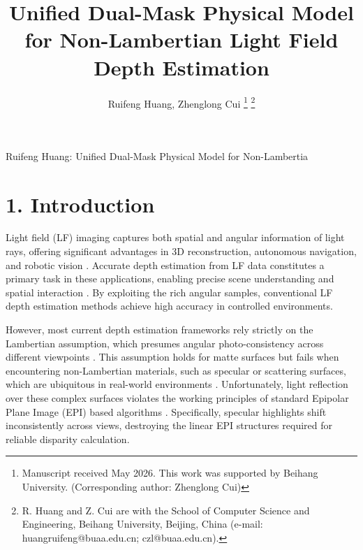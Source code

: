 \documentclass[lettersize,journal]{IEEEtran}
\begin{document}
\title{Unified Dual-Mask Physical Model for Non-Lambertian Light Field Depth Estimation}

\author{Ruifeng Huang, Zhenglong Cui
\thanks{Manuscript received May 2026. This work was supported by Beihang University. (Corresponding author: Zhenglong Cui)}
\thanks{R. Huang and Z. Cui are with the School of Computer Science and Engineering, Beihang University, Beijing, China (e-mail: huangruifeng@buaa.edu.cn; czl@buaa.edu.cn).}}

%
{Ruifeng Huang: Unified Dual-Mask Physical Model for Non-Lambertia}

\maketitle

\begin{abstract}

\end{abstract}

\begin{IEEEkeywords}

\end{IEEEkeywords}

\section{1. Introduction}

Light field (LF) imaging captures both spatial and angular information of light rays, offering significant advantages in 3D reconstruction, autonomous navigation, and robotic vision \cite{lightfieldimaging3Dreconst}. Accurate depth estimation from LF data constitutes a primary task in these applications, enabling precise scene understanding and spatial interaction \cite{depthestimationsceneunderst}. By exploiting the rich angular samples, conventional LF depth estimation methods achieve high accuracy in controlled environments.

However, most current depth estimation frameworks rely strictly on the Lambertian assumption, which presumes angular photo-consistency across different viewpoints \cite{Lambertianassumptionphotoco}. This assumption holds for matte surfaces but fails when encountering non-Lambertian materials, such as specular or scattering surfaces, which are ubiquitous in real-world environments \cite{nonLambertianmaterialsspecu}. Unfortunately, light reflection over these complex surfaces violates the working principles of standard Epipolar Plane Image (EPI) based algorithms \cite{EpipolarPlaneImageEPI}. Specifically, specular highlights shift inconsistently across views, destroying the linear EPI structures required for reliable disparity calculation.
\end{document}
